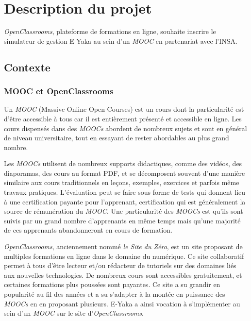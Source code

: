 \chapter{Description du projet}

    \emph{OpenClassrooms}, plateforme de formations en ligne, souhaite inscrire le simulateur de gestion E-Yaka au sein d'un \emph{MOOC} en partenariat avec l'INSA.

    \section{Contexte}
        \subsection{MOOC et OpenClassrooms}
        
            Un \emph{MOOC} (Massive Online Open Courses) est un cours dont la particularité est d’être accessible à tous car il est entièrement présenté et accessible en ligne. Les cours dispensés dans des \emph{MOOCs} abordent de nombreux sujets et sont en général de niveau universitaire, tout en essayant de rester abordables au plus grand nombre.

            Les \emph{MOOCs} utilisent de nombreux supports didactiques, comme des vidéos, des diaporamas, des cours au format PDF, et se décomposent souvent d’une manière similaire aux cours traditionnels en leçons, exemples, exercices et parfois même travaux pratiques. L’évaluation peut se faire sous forme de tests qui donnent lieu à une certification payante pour l’apprenant, certification qui est généralement la source de rémunération du \emph{MOOC}. Une particularité des \emph{MOOCs} est qu'ils sont suivis par un grand nombre d'apprenants en même temps mais qu'une majorité de ces apprenants abandonneront en cours de formation.      
        
            \emph{OpenClassrooms}, anciennement nommé \emph{le Site du Zéro}, est un site proposant de multiples formations en ligne dans le domaine du numérique. Ce site collaboratif permet à tous d’être lecteur et/ou rédacteur de tutoriels sur des domaines liés aux nouvelles technologies. De nombreux cours sont accessibles gratuitement, et certaines formations plus poussées sont payantes. Ce site a su grandir en popularité au fil des années et a su s’adapter à la montée en puissance des \emph{MOOCs} en en proposant plusieurs. E-Yaka a ainsi vocation à s'implémenter au sein d'un \emph{MOOC} sur le site d'\emph{OpenClassrooms}.

